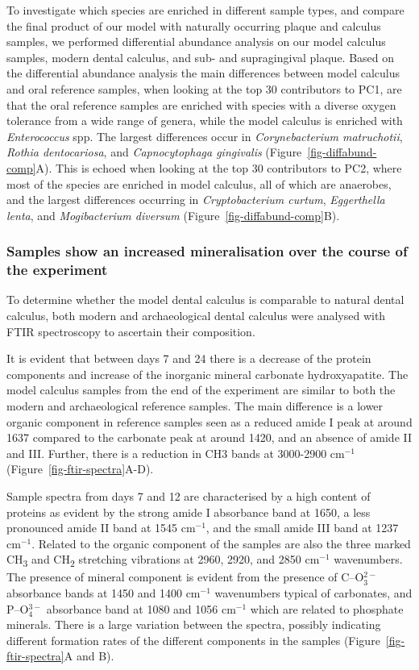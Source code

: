 \documentclass[10pt,a4paper]{article}
\begin{document}
To investigate which species are enriched in different sample types, and
compare the final product of our model with naturally occurring plaque
and calculus samples, we performed differential abundance analysis on
our model calculus samples, modern dental calculus, and sub- and
supragingival plaque. Based on the differential abundance analysis the
main differences between model calculus and oral reference samples, when
looking at the top 30 contributors to PC1, are that the oral reference
samples are enriched with species with a diverse oxygen tolerance from a
wide range of genera, while the model calculus is enriched with
\emph{Enterococcus} spp. The largest differences occur in
\emph{Corynebacterium matruchotii}, \emph{Rothia dentocariosa}, and
\emph{Capnocytophaga gingivalis} (Figure~\ref{fig-diffabund-comp}A).
This is echoed when looking at the top 30 contributors to PC2, where
most of the species are enriched in model calculus, all of which are
anaerobes, and the largest differences occurring in
\emph{Cryptobacterium curtum}, \emph{Eggerthella lenta}, and
\emph{Mogibacterium diversum} (Figure~\ref{fig-diffabund-comp}B).

\subsubsection*{Samples show an increased mineralisation over the course
of the
experiment}\label{samples-show-an-increased-mineralisation-over-the-course-of-the-experiment}

To determine whether the model dental calculus is comparable to natural
dental calculus, both modern and archaeological dental calculus were
analysed with FTIR spectroscopy to ascertain their composition.

It is evident that between days 7 and 24 there is a decrease of the
protein components and increase of the inorganic mineral carbonate
hydroxyapatite. The model calculus samples from the end of the
experiment are similar to both the modern and archaeological reference
samples. The main difference is a lower organic component in reference
samples seen as a reduced amide I peak at around 1637 compared to the
carbonate peak at around 1420, and an absence of amide II and III.
Further, there is a reduction in CH3 bands at 3000-2900 cm\(^{-1}\)
(Figure~\ref{fig-ftir-spectra}A-D).

Sample spectra from days 7 and 12 are characterised by a high content of
proteins as evident by the strong amide I absorbance band at 1650, a
less pronounced amide II band at 1545 cm\(^{-1}\), and the small amide
III band at 1237 cm\(^{-1}\). Related to the organic component of the
samples are also the three marked CH\textsubscript{3} and
CH\textsubscript{2} stretching vibrations at 2960, 2920, and 2850
cm\(^{-1}\) wavenumbers. The presence of mineral component is evident
from the presence of C--O\(^{2-}_3\) absorbance bands at 1450 and 1400
cm\(^{-1}\) wavenumbers typical of carbonates, and P--O\(^{3-}_4\)
absorbance band at 1080 and 1056 cm\(^{-1}\) which are related to
phosphate minerals. There is a large variation between the spectra,
possibly indicating different formation rates of the different
components in the samples (Figure~\ref{fig-ftir-spectra}A and B).
\end{document}
